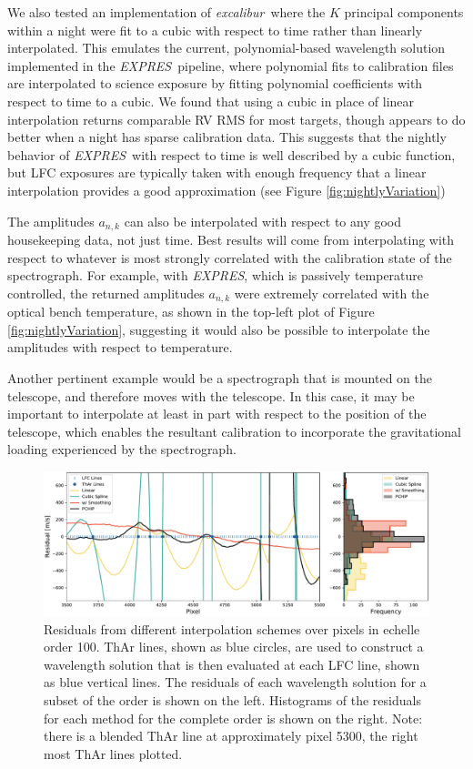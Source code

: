 \documentclass[twocolumn,table,xcolor,trackchanges]{aastex63}
\newcommand{\project}[1]{\textsl{#1}}
\newcommand{\name}{\project{excalibur}}
\newcommand{\acronym}[1]{{\small{#1}}}
\newcommand{\expres}{\project{\acronym{EXPRES}}}
\begin{document}
We also tested an implementation of \name\ where the $K$ principal components within a night were fit to a cubic with respect to time rather than linearly interpolated.  This emulates the current, polynomial-based wavelength solution implemented in the \expres\ pipeline, where polynomial fits to calibration files are interpolated to science exposure by fitting polynomial coefficients with respect to time to a cubic.  We found that using a cubic in place of linear interpolation returns comparable RV RMS for most targets, though appears to do better when a night has sparse calibration data.  This suggests that the nightly behavior of \expres\ with respect to time is well described by a cubic function, but LFC exposures are typically taken with enough frequency that a linear interpolation provides a good approximation (see Figure \ref{fig:nightlyVariation})

The amplitudes $a_{n,k}$ can also be interpolated with respect to any good housekeeping data, not just time.  Best results will come from interpolating with respect to whatever is most strongly correlated with the calibration state of the spectrograph.  For example, with \expres, which is passively temperature controlled, the returned amplitudes $a_{n,k}$ were extremely correlated with the optical bench temperature, as shown in the top-left plot of Figure \ref{fig:nightlyVariation}, suggesting it would also be possible to interpolate the amplitudes with respect to temperature.

Another pertinent example would be a spectrograph that is mounted on the telescope, and therefore moves with the telescope.  In this case, it may be important to interpolate at least in part with respect to the position of the telescope, which enables the resultant calibration to incorporate the gravitational loading experienced by the spectrograph.

\begin{figure}[t]
\centering
\includegraphics[width=\textwidth]{Figures/intpx_tests.pdf}
\caption{Residuals from different interpolation schemes over pixels in echelle order 100.  ThAr lines, shown as blue circles, are used to construct a wavelength solution that is then evaluated at each LFC line, shown as blue vertical lines.  The residuals of each wavelength solution for a subset of the order is shown on the left.  Histograms of the residuals for each method for the complete order is shown on the right.  Note: there is a blended ThAr line at approximately pixel 5300, the right most ThAr lines plotted.}
\label{fig:xinterp}
\end{figure} 
\end{document}
